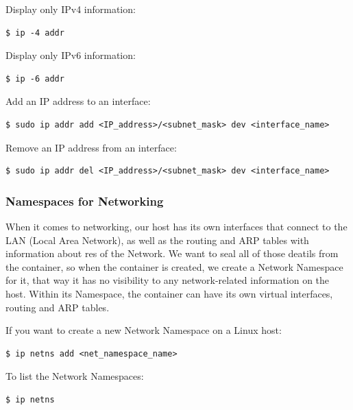 \documentclass{article}
\newenvironment{codetemplate}[1][]{%
  \mybasecolorbox[#1]
  \itshape
}{%
  \endmybasecolorbox
}
\begin{document}
Display only IPv4 information:
\begin{codetemplate}{}
\begin{verbatim}
$ ip -4 addr
\end{verbatim}
\end{codetemplate}

Display only IPv6 information:
\begin{codetemplate}{}
\begin{verbatim}
$ ip -6 addr
\end{verbatim}
\end{codetemplate}

Add an IP address to an interface:
\begin{codetemplate}{}
\begin{verbatim}
$ sudo ip addr add <IP_address>/<subnet_mask> dev <interface_name>
\end{verbatim}
\end{codetemplate}

Remove an IP address from an interface:
\begin{codetemplate}{}
\begin{verbatim}
$ sudo ip addr del <IP_address>/<subnet_mask> dev <interface_name>
\end{verbatim}
\end{codetemplate}

\subsubsection{Namespaces for Networking}
When it comes to networking, our host has its own interfaces that connect to the LAN (Local Area Network), as well as the routing and ARP tables with information about res of the Network. We want to seal all of those deatils from the container, so when the container is created, we create a Network Namespace for it, that way it has no visibility to any network-related information on the host. Within its Namespace, the container can have its own virtual interfaces, routing and ARP tables.

If you want to create a new Network Namespace on a Linux host:
\begin{codetemplate}{}
\begin{verbatim}
$ ip netns add <net_namespace_name>
\end{verbatim}
\end{codetemplate}

To list the Network Namespaces:
\begin{codetemplate}{}
\begin{verbatim}
$ ip netns
\end{verbatim}
\end{codetemplate}
\end{document}
